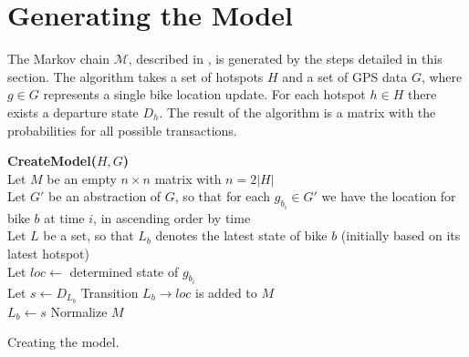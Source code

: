 \section{Generating the Model}\label{sec:generatemarkov}
The Markov chain $\mathcal{M}$, described in , is generated by the steps detailed in this section.
The algorithm takes a set of hotspots $H$ and a set of GPS data $G$, where $g \in G$ represents a single bike location update. For each hotspot $h \in H$ there exists a departure state $D_h$.
The result of the algorithm is a matrix with the probabilities for all possible transactions.

\begin{algorithm}[H]
\SetAlgoNoEnd
\textbf{CreateModel($H, G$)} \\
Let $M$ be an empty $n \times n$ matrix with $n = 2|H|$ \\
Let $G'$ be an abstraction of $G$, so that for each $g_{b_i} \in G'$ we have the location for bike $b$ at time $i$, in ascending order by time\\
Let $L$ be a set, so that $L_b$ denotes the latest state of bike $b$ (initially based on its latest hotspot)\\
    {Let $loc \leftarrow $ determined state of $g_{b_i}$\\
      {Let $s \leftarrow D_{L_b}$}
    Transition $L_b \rightarrow loc$ is added to $M$\\
     $L_b \leftarrow s$}
Normalize $M$\\
\caption{Creating the model.}
\label{markov:create_model}
\end{algorithm}